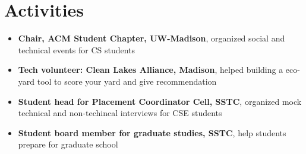 \documentclass{resume}
\begin{document}
\section{Activities}
\begin{itemize}
  \item \textbf{Chair, ACM Student Chapter, UW-Madison}, organized social and technical events for CS students
  \item \textbf{Tech volunteer: Clean Lakes Alliance, Madison}, helped building a eco-yard tool to score your yard and give recommendation
  \item \textbf{Student head for Placement Coordinator Cell, SSTC}, organized mock technical and non-techincal interviews for CSE students
  \item \textbf{Student board member for graduate studies, SSTC}, help students prepare for graduate school
\end{itemize}

%
%
\end{document}
